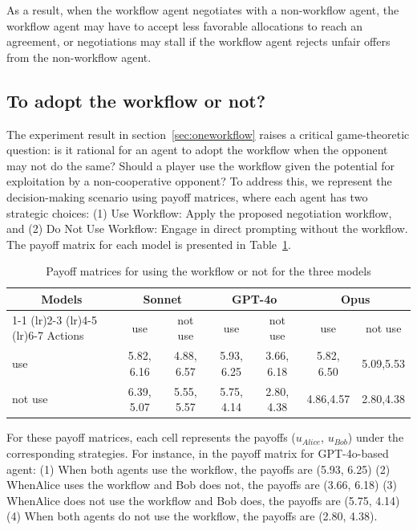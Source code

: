 As a result, when the workflow agent negotiates with a non-workflow agent, the workflow agent may have to accept less favorable allocations to reach an agreement, or negotiations may stall if the workflow agent rejects unfair offers from the non-workflow agent.

\subsection{To adopt the workflow or not?}
\label{sec:meta-strategy}
The experiment result in section~\ref{sec:oneworkflow} raises a critical game-theoretic question: is it rational for an agent to adopt the workflow when the opponent may not do the same? Should a player use the workflow given the potential for exploitation by a non-cooperative opponent? To address this, we represent the decision-making scenario using payoff matrices, where each agent has two strategic choices: (1) Use Workflow: Apply the proposed negotiation workflow, and (2) Do Not Use Workflow: Engage in direct prompting without the workflow. The payoff matrix for each model is presented in Table~\ref{tab:workflow_ne}.

\begin{table}[!ht]
    \centering
    \begin{tabular}{l cc cc cc}
    \toprule
        \multicolumn{1}{c}{\bf Models} & \multicolumn{2}{c}{\bf Sonnet} & \multicolumn{2}{c}{\bf GPT-4o} & \multicolumn{2}{c}{\bf Opus}\\
        \cmidrule(lr){1-1} \cmidrule(lr){2-3} \cmidrule(lr){4-5} \cmidrule(lr){6-7}
         Actions  & use & not use & use & not use & use & not use   \\
        \midrule
        use & 5.82, 6.16 & 4.88, 6.57 & 5.93, 6.25 & 3.66, 6.18  & 5.82, 6.50 & 5.09,5.53  \\
        not use  & 6.39, 5.07 & 5.55, 5.57   & 5.75, 4.14 & 2.80, 4.38  & 4.86,4.57 & 2.80,4.38  \\
        \bottomrule
    \end{tabular}
    \caption{Payoff matrices for using the workflow or not for the three models}
    \label{tab:workflow_ne}
\end{table}

For these payoff matrices, each cell represents the payoffs ($u_{Alice}$, $u_{Bob}$) under the corresponding strategies. For instance, in the payoff matrix for GPT-4o-based agent: (1) When both agents use the workflow, the payoffs are (5.93, 6.25) (2) WhenAlice uses the workflow and Bob does not, the payoffs are (3.66, 6.18) (3) WhenAlice does not use the workflow and Bob does, the payoffs are (5.75, 4.14) (4) When both agents do not use the workflow, the payoffs are (2.80, 4.38). 


